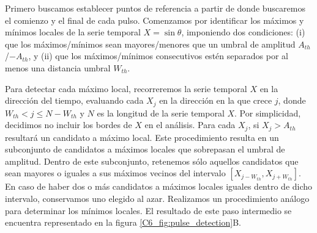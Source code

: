 \documentclass[./main.tex]{subfiles}
\begin{document}
Primero buscamos establecer puntos de referencia a partir de donde buscaremos el comienzo y el final de cada pulso. Comenzamos por identificar los máximos y mínimos locales de la serie temporal $X = \sin{\theta}$, imponiendo dos condiciones: (i) que los máximos/mínimos sean mayores/menores que un umbral de amplitud $A_{th}$/$-A_{th}$, y (ii) que los máximos/mínimos consecutivos estén separados por al menos una distancia umbral $W_{th}$. 


Para detectar cada máximo local, recorreremos la serie temporal $X$ en la dirección del tiempo, evaluando cada $X_j$ en la dirección en la que crece $j$, donde $W_{th} < j \leq N - W_{th}$ y $N$ es la longitud de la serie temporal $X$. Por simplicidad, decidimos no incluir los bordes de $X$ en el análisis. Para cada $X_j$, si $X_j > A_{th}$ resultará un candidato a máximo local. Este procedimiento resulta en un subconjunto de candidatos a máximos locales que sobrepasan el umbral de amplitud. Dentro de este subconjunto, retenemos sólo aquellos candidatos que sean mayores o iguales a sus máximos vecinos del intervalo $\left[ X_{j-W_{th}},X_{j+W_{th}}\right]$. En caso de haber dos o más candidatos a máximos locales iguales dentro de dicho intervalo, conservamos uno elegido al azar. Realizamos un procedimiento análogo para determinar los mínimos locales. El resultado de este paso intermedio se encuentra representado en la figura \ref{C6_fig:pulse_detection}B.
 
\end{document}
